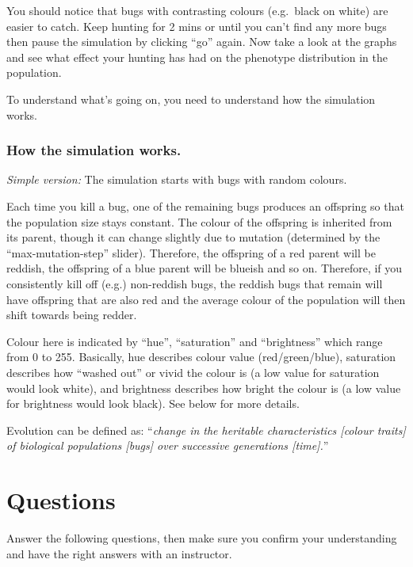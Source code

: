 \documentclass[
  a4paper]{book}
\begin{document}
You should notice that bugs with contrasting colours (e.g.~black on white) are easier to catch. Keep hunting for 2 mins or until you can't find any more bugs then pause the simulation by clicking ``go'' again. Now take a look at the graphs and see what effect your hunting has had on the phenotype distribution in the population.

To understand what's going on, you need to understand how the simulation works.

\subsubsection{How the simulation works.}\label{how-the-simulation-works.-1}

\emph{Simple version:}
The simulation starts with bugs with random colours.

Each time you kill a bug, one of the remaining bugs produces an offspring so that the population size stays constant. The colour of the offspring is inherited from its parent, though it can change slightly due to mutation (determined by the ``max-mutation-step'' slider). Therefore, the offspring of a red parent will be reddish, the offspring of a blue parent will be blueish and so on. Therefore, if you consistently kill off (e.g.) non-reddish bugs, the reddish bugs that remain will have offspring that are also red and the average colour of the population will then shift towards being redder.

Colour here is indicated by ``hue'', ``saturation'' and ``brightness'' which range from 0 to 255. Basically, hue describes colour value (red/green/blue), saturation describes how ``washed out'' or vivid the colour is (a low value for saturation would look white), and brightness describes how bright the colour is (a low value for brightness would look black). See below for more details.

Evolution can be defined as: ``\emph{change in the heritable characteristics {[}colour traits{]} of biological populations {[}bugs{]} over successive generations {[}time{]}.}''

\section{Questions}\label{questions-1}

Answer the following questions, then make sure you confirm your understanding and have the right answers with an instructor.
\end{document}

